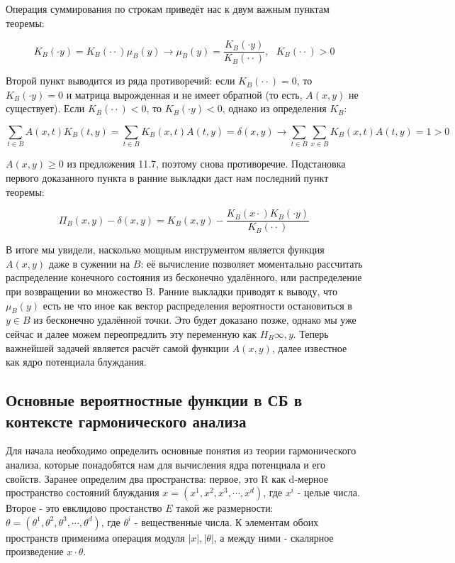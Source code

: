 Операция суммирования по строкам приведёт нас к двум важным пунктам теоремы:

\[ K_B(\cdot y) = K_B(\cdot \cdot) \mu_B(y) \rightarrow \mu_B(y) = \frac{K_B(\cdot y)}{K_B(\cdot \cdot)},\ \ \ K_B(\cdot \cdot) > 0 \]

Второй пункт выводится из ряда противоречий: если $K_B(\cdot \cdot) = 0$, то $K_B(\cdot y) = 0$ и матрица вырожденная и не имеет обратной (то есть, $A(x,y)$ 
не существует). Если $K_B(\cdot \cdot) < 0$, то $K_B(\cdot y) < 0$, однако из определения $K_B$: 

\[ \sum_{t \in B} A(x,t) K_B(t,y) = \sum_{t \in B} K_B(x,t) A(t,y) = \delta(x,y) \rightarrow \sum_{t \in B} \sum_{x \in B} K_B(x,t) A(t,y) = 1 > 0 \]

$A(x,y) \geq 0$ из предложения 11.7, поэтому снова противоречие.
Подстановка первого доказанного пункта в ранние выкладки даст нам последний пункт теоремы:

\begin{equation}
\Pi_B(x,y) - \delta(x,y) = K_B(x,y) - \frac{K_B(x \cdot) K_B(\cdot y)}{K_B(\cdot \cdot)}
\label{eq:P_b}
\end{equation}

В итоге мы увидели, насколько мощным инструментом является функция $A(x,y)$ даже в сужении на $B$: её вычисление позволяет моментально рассчитать распределение 
конечного состояния из бесконечно удалённого, или распределение при возвращении во множество B. 
Ранние выкладки приводят к выводу, что $\mu_B(y)$ есть не что иное как вектор распределения вероятности остановиться в $y \in B$ из бесконечно удалённой точки.
Это будет доказано позже, однако мы уже сейчас и далее можем переопредлить эту переменную как $H_B{\infty, y}$. 
Теперь важнейшей задачей является расчёт самой функции $A(x,y)$, далее известное как ядро потенциала блуждания. 

\subsection{Основные вероятностные функции в СБ в контексте гармонического анализа}

Для начала необходимо определить основные понятия из теории гармонического анализа, которые понадобятся нам для вычисления ядра потенциала и его свойств.
Заранее определим два пространства: первое, это R как d-мерное пространство состояний блуждания \newline $x = (x^1, x^2, x^3, \cdots, x^d)$, где $x^i$ - целые числа. 
Второе - это евклидово простанство $E$ такой же размерности: $\theta = (\theta^1, \theta^2, \theta^3, \cdots, \theta^d)$, где $\theta^i$ - вещественные числа.
К элементам обоих пространств применима операция модуля $|x|, |\theta|$, а между ними - скалярное произведение $x \cdot \theta$.

